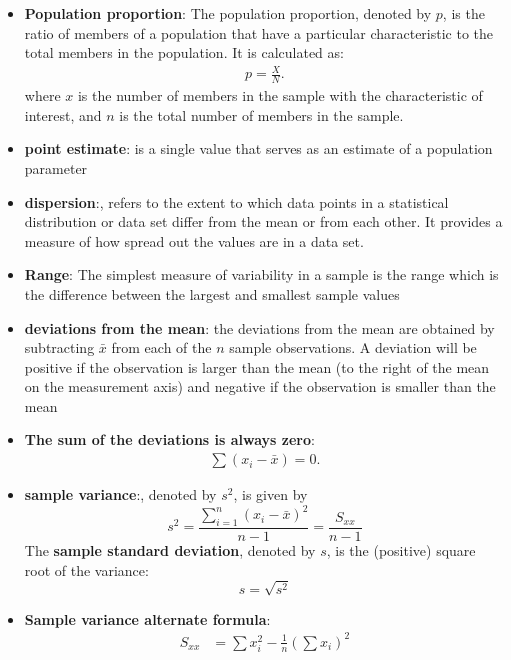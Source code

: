 \documentclass{report}
\begin{document}
\begin{itemize}
        \item \textbf{Population proportion}: The population proportion, denoted by \( p \), is the ratio of members of a population that have a particular characteristic to the total members in the population. It is calculated as:
            \begin{align*}
                p = \frac{X}{N}
            .\end{align*}
            where \( x \) is the number of members in the sample with the characteristic of interest, and \( n \) is the total number of members in the sample.
        \item \textbf{point estimate}: is a single value that serves as an estimate of a population parameter
        \item \textbf{dispersion}:, refers to the extent to which data points in a statistical distribution or data set differ from the mean or from each other. It provides a measure of how spread out the values are in a data set.
        \item \textbf{Range}: The simplest measure of variability in a sample is the range which is the difference
            between the largest and smallest sample values
        \item \textbf{deviations from the mean}:
            the deviations from the mean are obtained by
            subtracting $\bar{x}$ from each of the $n $ sample observations. A deviation will be positive if
            the observation is larger than the mean (to the right of the mean on the measurement
            axis) and negative if the observation is smaller than the mean
        \item \textbf{The sum of the deviations is always zero}:
            \begin{align*}
                \sum (x_{i} - \bar{x}) = 0
            .\end{align*}
        \item \textbf{sample variance}:, denoted by \( s^2 \), is given by
            \[
                s^2 = \frac{\sum_{i=1}^{n} (x_i - \bar{x})^2}{n - 1} = \frac{S_{xx}}{n - 1}
            \]
            The \textbf{sample standard deviation}, denoted by \( s \), is the (positive) square root of the variance:
            \[
                s = \sqrt{s^2}
            \]
        \item \textbf{Sample variance alternate formula}:
            \begin{align*}
                S_{xx} &= \sum x_{i}^{2} - \frac{1}{n}\left(\sum x_{i}\right)^{2} \\

\end{align*}
\end{itemize}
\end{document}
